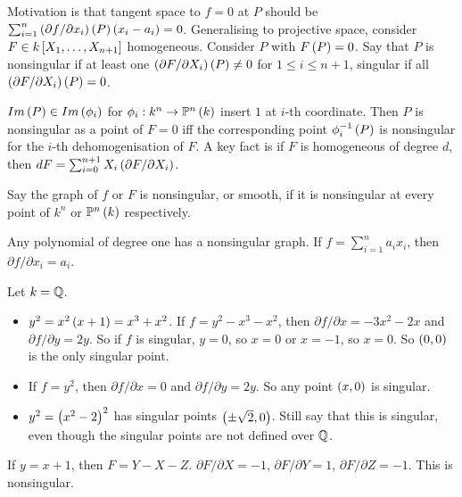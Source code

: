 Motivation is that tangent space to $ f = 0 $ at $ P $ should be $ \sum_{i = 1}^n \rb{\partial f / \partial x_i}\rb{P}\rb{x_i - a_i} = 0 $. Generalising to projective space, consider $ F \in k\sb{X_1, \dots, X_{n + 1}} $ homogeneous. Consider $ P $ with $ F\rb{P} = 0 $. Say that $ P $ is nonsingular if at least one $ \rb{\partial F / \partial X_i}\rb{P} \ne 0 $ for $ 1 \le i \le n + 1 $, singular if all $ \rb{\partial F / \partial X_i}\rb{P} = 0 $.

\begin{fact*}
$ Im\rb{P} \in Im\rb{\phi_i} $ for $ \phi_i : k^n \to \P^n\rb{k} $ insert $ 1 $ at $ i $-th coordinate. Then $ P $ is nonsingular as a point of $ F = 0 $ iff the corresponding point $ \phi_i^{-1}\rb{P} $ is nonsingular for the $ i $-th dehomogenisation of $ F $. A key fact is if $ F $ is homogeneous of degree $ d $, then $ dF = \sum_{i = 0}^{n + 1} X_i\rb{\partial F / \partial X_i} $.
\end{fact*}

\begin{definition}
Say the graph of $ f $ or $ F $ is nonsingular, or smooth, if it is nonsingular at every point of $ k^n $ or $ \P^n\rb{k} $ respectively.
\end{definition}

\begin{example*}
Any polynomial of degree one has a nonsingular graph. If $ f = \sum_{i = 1}^n a_ix_i $, then $ \partial f / \partial x_i = a_i $.
\end{example*}

\begin{example*}
Let $ k = \Q $.
\begin{itemize}
\item $ y^2 = x^2\rb{x + 1} = x^3 + x^2 $. If $ f = y^2 - x^3 - x^2 $, then $ \partial f / \partial x = -3x^2 - 2x $ and $ \partial f / \partial y = 2y $. So if $ f $ is singular, $ y = 0 $, so $ x = 0 $ or $ x = -1 $, so $ x = 0 $. So $ \rb{0, 0} $ is the only singular point.
\item If $ f = y^2 $, then $ \partial f / \partial x = 0 $ and $ \partial f / \partial y = 2y $. So any point $ \rb{x, 0} $ is singular.
\item $ y^2 = \rb{x^2 - 2}^2 $ has singular points $ \rb{\pm \sqrt{2}, 0} $. Still say that this is singular, even though the singular points are not defined over $ \Q $.
\end{itemize}
\end{example*}

\begin{example*}
If $ y = x + 1 $, then $ F = Y - X - Z $. $ \partial F / \partial X = -1 $, $ \partial F / \partial Y = 1 $, $ \partial F / \partial Z = -1 $. This is nonsingular.
\end{example*}

